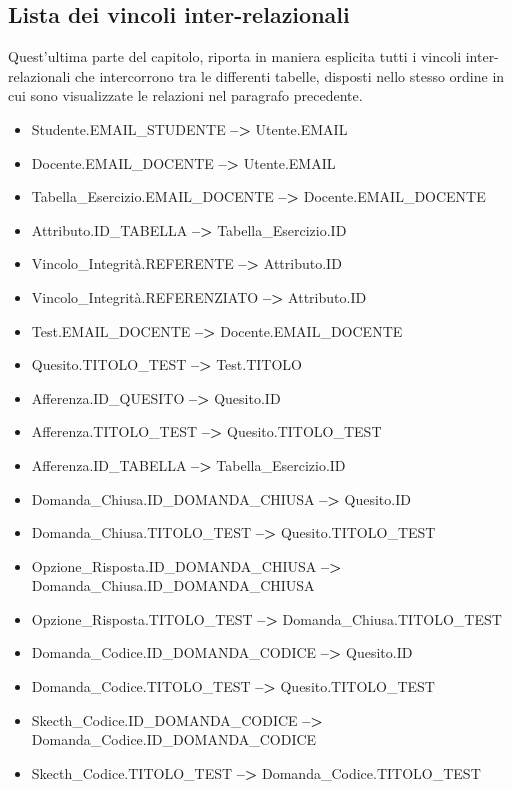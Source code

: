\documentclass{article}
\begin{document}
\subsection{Lista dei vincoli inter-relazionali}
\large
Quest'ultima parte del capitolo, riporta in maniera esplicita tutti i vincoli inter-relazionali che intercorrono tra le differenti tabelle, disposti nello stesso ordine in cui sono visualizzate le relazioni nel paragrafo precedente.
\begin{itemize}[label={ }, leftmargin=*, wide=1pt]
    \itemsep0em
    \item Studente.EMAIL\_STUDENTE \textbf{-->} Utente.EMAIL
    \item Docente.EMAIL\_DOCENTE \textbf{-->} Utente.EMAIL
    \item Tabella\_Esercizio.EMAIL\_DOCENTE \textbf{-->} Docente.EMAIL\_DOCENTE
    \item Attributo.ID\_TABELLA \textbf{-->} Tabella\_Esercizio.ID
    \item Vincolo\_Integrità.REFERENTE \textbf{-->} Attributo.ID
    \item Vincolo\_Integrità.REFERENZIATO \textbf{-->} Attributo.ID
    \item Test.EMAIL\_DOCENTE \textbf{-->} Docente.EMAIL\_DOCENTE
    \item Quesito.TITOLO\_TEST \textbf{-->} Test.TITOLO
    \item Afferenza.ID\_QUESITO \textbf{-->} Quesito.ID
    \item Afferenza.TITOLO\_TEST \textbf{-->} Quesito.TITOLO\_TEST
    \item Afferenza.ID\_TABELLA \textbf{-->} Tabella\_Esercizio.ID
    \item Domanda\_Chiusa.ID\_DOMANDA\_CHIUSA \textbf{-->} Quesito.ID
    \item Domanda\_Chiusa.TITOLO\_TEST \textbf{-->} Quesito.TITOLO\_TEST
    \item Opzione\_Risposta.ID\_DOMANDA\_CHIUSA \textbf{-->} Domanda\_Chiusa.ID\_DOMANDA\_CHIUSA 
    \item Opzione\_Risposta.TITOLO\_TEST \textbf{-->} Domanda\_Chiusa.TITOLO\_TEST 
    \item Domanda\_Codice.ID\_DOMANDA\_CODICE \textbf{-->} Quesito.ID
    \item Domanda\_Codice.TITOLO\_TEST \textbf{-->} Quesito.TITOLO\_TEST
    \item Skecth\_Codice.ID\_DOMANDA\_CODICE \textbf{-->} Domanda\_Codice.ID\_DOMANDA\_CODICE
    \item Skecth\_Codice.TITOLO\_TEST \textbf{-->} Domanda\_Codice.TITOLO\_TEST

\end{itemize}
\end{document}
